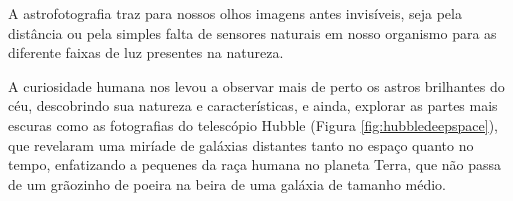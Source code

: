 \documentclass[
	article,			%
	12pt,				%
	oneside,			%
	a4paper,			%
	english,			%
	brazil,				%
	sumario=tradicional
	]{abntex2}
\begin{document}
A astrofotografia traz para nossos olhos imagens antes invisíveis, seja pela
distância ou pela simples falta de sensores naturais em nosso organismo para as 
diferente faixas de luz presentes na natureza.

A curiosidade humana nos levou a observar mais de perto os astros brilhantes do
céu, descobrindo sua natureza e características, e ainda, explorar as partes mais
escuras como as fotografias do telescópio Hubble (Figura \ref{fig:hubbledeepspace}),
que revelaram uma miríade de galáxias distantes tanto no espaço quanto no tempo,
enfatizando a pequenes da raça humana no planeta Terra, que não passa de um
grãozinho de poeira na beira de uma galáxia de tamanho médio.


\newpage
\postextual{}


\end{document}
